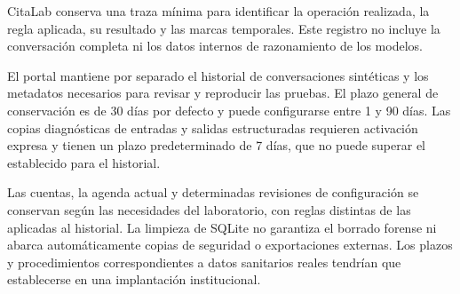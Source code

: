 CitaLab conserva una traza mínima para identificar la operación realizada, la regla aplicada, su resultado y las marcas temporales. Este registro no incluye la conversación completa ni los datos internos de razonamiento de los modelos.

El portal mantiene por separado el historial de conversaciones sintéticas y los metadatos necesarios para revisar y reproducir las pruebas. El plazo general de conservación es de 30 días por defecto y puede configurarse entre 1 y 90 días. Las copias diagnósticas de entradas y salidas estructuradas requieren activación expresa y tienen un plazo predeterminado de 7 días, que no puede superar el establecido para el historial.

Las cuentas, la agenda actual y determinadas revisiones de configuración se conservan según las necesidades del laboratorio, con reglas distintas de las aplicadas al historial. La limpieza de SQLite no garantiza el borrado forense ni abarca automáticamente copias de seguridad o exportaciones externas. Los plazos y procedimientos correspondientes a datos sanitarios reales tendrían que establecerse en una implantación institucional.
